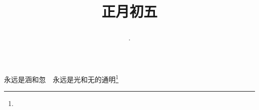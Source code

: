 \title{\date[d=14,m=2,y=2024][year:cn-y,年,month:cn,day:cn,日,·,weekday]·正月初五 }
永远是涵和忽　永远是光和无的通明\footnote{ }

